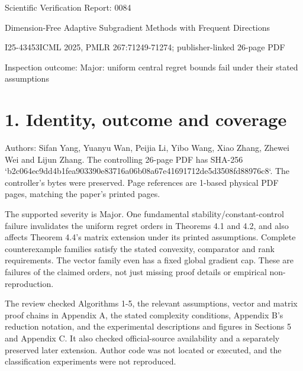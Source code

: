 \documentclass[10pt]{article}
\begin{document}
Scientific Verification Report: 0084\par
Dimension-Free Adaptive Subgradient Methods with Frequent Directions\par
I25-43453ICML 2025, PMLR 267:71249-71274; publisher-linked 26-page PDF\par
Inspection outcome: Major: uniform central regret bounds fail under their stated assumptions\par
\section*{1. Identity, outcome and coverage}
Authors: Sifan Yang, Yuanyu Wan, Peijia Li, Yibo Wang, Xiao Zhang, Zhewei Wei and Lijun Zhang. The controlling 26-page PDF has SHA-256 `b2c064ec9dd4b1fea903390e83716a06b08a67e41691712de5d3508fd88976c8`. The controller’s bytes were preserved. Page references are 1-based physical PDF pages, matching the paper’s printed pages.\par
The supported severity is Major. One fundamental stability/constant-control failure invalidates the uniform regret orders in Theorems 4.1 and 4.2, and also affects Theorem 4.4’s matrix extension under its printed assumptions. Complete counterexample families satisfy the stated convexity, comparator and rank requirements. The vector family even has a fixed global gradient cap. These are failures of the claimed orders, not just missing proof details or empirical non-reproduction.\par
The review checked Algorithms 1-5, the relevant assumptions, vector and matrix proof chains in Appendix A, the stated complexity conditions, Appendix B’s reduction notation, and the experimental descriptions and figures in Sections 5 and Appendix C. It also checked official-source availability and a separately preserved later extension. Author code was not located or executed, and the classification experiments were not reproduced.\par
\end{document}
